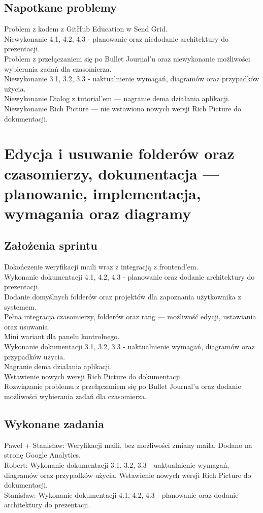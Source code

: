 \documentclass[a4paper,11pt]{report}
\begin{document}
\subsection {Napotkane problemy}
Problem z kodem z GitHub Education w Send Grid.\\
Niewykonanie 4.1, 4.2, 4.3 - planowanie oraz niedodanie architektury do prezentacji.\\
Problem z przełączaniem się po Bullet Journal'u oraz niewykonanie możliwości wybierania zadań dla czasomierza.\\
Niewykonanie 3.1, 3.2, 3.3 - uaktualnienie wymagań, diagramów oraz przypadków użycia.\\
Niewykonanie Dialog z tutorial'em — nagranie dema działania aplikacji.\\
Niewykonanie Rich Picture — nie wstawiono nowych wersji Rich Picture do dokumentacji.\\


\section {Edycja i usuwanie folderów oraz czasomierzy, dokumentacja — planowanie, implementacja, wymagania oraz diagramy}
\label{sec:system_sesji_pracy}
\subsection {Założenia sprintu}
Dokończenie weryfikacji maili wraz z integracją z frontend'em.\\
Wykonanie dokumentacji 4.1, 4.2, 4.3 - planowanie oraz dodanie architektury do prezentacji.\\
Dodanie domyślnych folderów oraz projektów dla zapoznania użytkownika z systemem.\\
Pełna integracja czasomierzy, folderów oraz rang — możliwość edycji, ustawiania oraz usuwania.\\
Mini wariant dla panelu kontrolnego.\\
Wykonanie dokumentacji 3.1, 3.2, 3.3 - uaktualnienie wymagań, diagramów oraz przypadków użycia.\\
Nagranie dema działania aplikacji.\\
Wstawienie nowych wersji Rich Picture do dokumentacji.\\
Rozwiązanie problemu z przełączaniem się po Bullet Journal'u oraz dodanie możliwości wybierania zadań dla czasomierza.\\
\subsection {Wykonane zadania}
Paweł + Stanisław: Weryfikacji maili, bez możliwości zmiany maila. Dodano na stronę Google Analytics.\\
Robert: Wykonanie dokumentacji 3.1, 3.2, 3.3 - uaktualnienie wymagań, diagramów oraz przypadków użycia. Wstawienie nowych wersji Rich Picture do dokumentacji.\\
Stanisław: Wykonanie dokumentacji 4.1, 4.2, 4.3 - planowanie oraz dodanie architektury do prezentacji.\\
\end{document}

